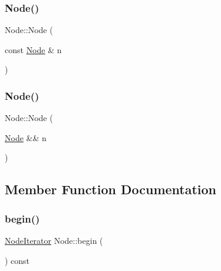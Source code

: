 \mbox{\label{class_node_a277918b68827f6ffd8150f450b0c12c3}} 
\subsubsection{\texorpdfstring{Node()}{Node()}\hspace{0.1cm}{\footnotesize\ttfamily [2/3]}}
{\footnotesize\ttfamily Node\+::\+Node (\begin{DoxyParamCaption}\item[{const \hyperlink{class_node}{Node} \&}]{n }\end{DoxyParamCaption})\hspace{0.3cm}{\ttfamily [inline]}}

\mbox{\label{class_node_a87c9938dcd77c169802a732c98204945}} 
\subsubsection{\texorpdfstring{Node()}{Node()}\hspace{0.1cm}{\footnotesize\ttfamily [3/3]}}
{\footnotesize\ttfamily Node\+::\+Node (\begin{DoxyParamCaption}\item[{\hyperlink{class_node}{Node} \&\&}]{n }\end{DoxyParamCaption})\hspace{0.3cm}{\ttfamily [inline]}}



\subsection{Member Function Documentation}
\mbox{\label{class_node_a319b65eca94c9438201ebda99ab90a65}} 
\subsubsection{\texorpdfstring{begin()}{begin()}}
{\footnotesize\ttfamily \hyperlink{class_node_1_1_node_iterator}{Node\+Iterator} Node\+::begin (\begin{DoxyParamCaption}{ }\end{DoxyParamCaption}) const\hspace{0.3cm}{\ttfamily [inline]}}

